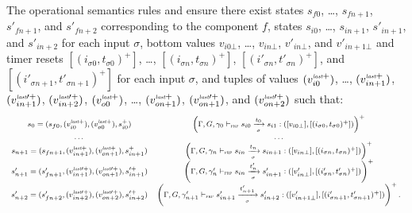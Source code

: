 \begin{skippableproof}
    The operational semantics rules  and
     ensure there exist states $s_{f0}$,
    \dots, $s_{fn+1}$, $s'_{fn+1}$, and $s'_{fn+2}$ corresponding to the component $f$, states
    $s_{i0}$, \dots, $s_{in+1}$, $s'_{in+1}$, and $s'_{in+2}$ for each input $\sigma$, bottom values
    $v_{i0\bot}$, \dots, $v_{in\bot}$, $v'_{in\bot}$, and $v'_{in+1\bot}$ and timer resets
    $[(i_{\sigma0}, t_{\sigma0})^+]$, \dots, $[(i_{\sigma n}, t_{\sigma n})^+]$,
    $[(i'_{\sigma n}, t'_{\sigma n})^+]$, and $[(i'_{\sigma n+1}, t'_{\sigma n+1})^+]$ for each
    input $\sigma$, and tuples of values $(v_{i0}^{{\textit{\tiny last}}+})$, \dots, $(v_{in+1}^{{\textit{\tiny last}}+})$,
    $(v_{in+1}^{{\textit{\tiny last}}\prime+})$, $(v_{in+2}^{{\textit{\tiny last}}\prime+})$, $(v_{o0}^{{\textit{\tiny last}}+})$, \dots,
    $(v_{on+1}^{{\textit{\tiny last}}+})$, $(v_{on+1}^{{\textit{\tiny last}}\prime+})$, and $(v_{on+2}^{{\textit{\tiny last}}\prime+})$
    such that:
    \begin{equation*}
        \mbox{\footnotesize\ensuremath{\begin{array}{cc}
                s_0 = (s_{f0}, (v_{i0}^{{\textit{\tiny last}}+}), (v_{o0}^{{\textit{\tiny last}}+}), s_{i0}^+)                                   & \left(\Gamma, G, \gamma_0 \vdash_{\textnormal{\tiny\textsc{frp}}} s_{i0} \xrightarrow[\mbox{\tiny\ensuremath{\sigma}}]{t_0} s_{i1}: ([v_{i0\bot}], [(i_{\sigma0}, t_{\sigma0})^+])\right)^+                             \\
                \dots                                                                                                  & \dots                                                                                                                                   \\
                s_{n+1} = (s_{fn+1}, (v_{in+1}^{{\textit{\tiny last}}+}), (v_{on+1}^{{\textit{\tiny last}}+}), s_{in+1}^+)                       & \left(\Gamma, G, \gamma_n \vdash_{\textnormal{\tiny\textsc{frp}}} s_{in} \xrightarrow[\mbox{\tiny\ensuremath{\sigma}}]{t_n} s_{in+1}: ([v_{in\bot}], [(i_{\sigma n}, t_{\sigma n})^+])\right)^+                         \\
                s'_{n+1} = (s'_{fn+1}, (v_{in+1}^{{\textit{\tiny last}}\prime+}), (v_{on+1}^{{\textit{\tiny last}}\prime+}), s_{in+1}^{\prime+}) & \left(\Gamma, G, \gamma'_n \vdash_{\textnormal{\tiny\textsc{frp}}} s_{in} \xrightarrow[\mbox{\tiny\ensuremath{\sigma}}]{t'_n} s'_{in+1}: ([v'_{in\bot}], [(i'_{\sigma n}, t'_{\sigma n})^+])\right)^+                   \\
                s'_{n+2} = (s'_{fn+2}, (v_{in+2}^{{\textit{\tiny last}}\prime+}), (v_{on+2}^{{\textit{\tiny last}}\prime+}), s_{in+2}^{\prime+}) & \left(\Gamma, G, \gamma'_{n+1} \vdash_{\textnormal{\tiny\textsc{frp}}} s'_{in+1} \xrightarrow[\mbox{\tiny\ensuremath{\sigma}}]{t'_{n+1}} s'_{in+2}: ([v'_{in+1\bot}], [(i'_{\sigma n+1}, t'_{\sigma n+1})^+])\right)^+.
            \end{array}}}
    \end{equation*}


\end{skippableproof}
